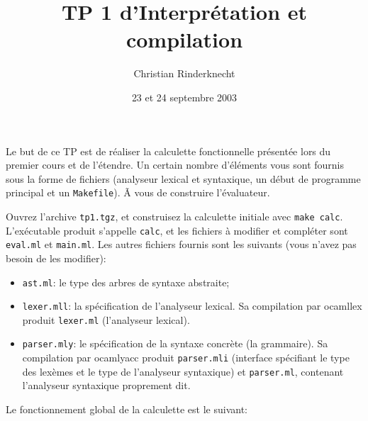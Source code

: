 \documentclass[a4paper,11pt]{article}
\title{TP 1 d'Interprétation et compilation}
\author{Christian Rinderknecht}
\date{23 et 24 septembre 2003}
\begin{document}
\maketitle

Le but de ce TP est de réaliser la calculette fonctionnelle présentée
lors du premier cours et de l'étendre. Un certain nombre d'éléments
vous sont fournis sous la forme de fichiers (analyseur lexical et
syntaxique, un début de programme principal et un
\texttt{Makefile}). Ã vous de construire l'évaluateur.

\bigskip

Ouvrez l'archive \texttt{tp1.tgz}, et construisez la calculette
initiale avec \texttt{make calc}. L'exécutable produit s'appelle
\texttt{calc}, et les fichiers à modifier et compléter sont
\texttt{eval.ml} et \texttt{main.ml}. Les autres fichiers fournis sont
les suivants (vous n'avez pas besoin de les modifier):

\begin{itemize}

  \item \texttt{ast.ml}: le type des arbres de syntaxe abstraite;

  \item \texttt{lexer.mll}: la spécification de l'analyseur
    lexical. Sa compilation par \textsf{ocamllex} produit
    \texttt{lexer.ml} (l'analyseur lexical).

  \item \texttt{parser.mly}: le spécification de la syntaxe concrète
    (la grammaire). Sa compilation par \textsf{ocamlyacc} produit
    \texttt{parser.mli} (interface spécifiant le type des lexèmes et
    le type de l'analyseur syntaxique) et \texttt{parser.ml},
    contenant l'analyseur syntaxique proprement dit.

\end{itemize}

\medskip

\noindent Le fonctionnement global de la calculette est le suivant:
\end{document}
